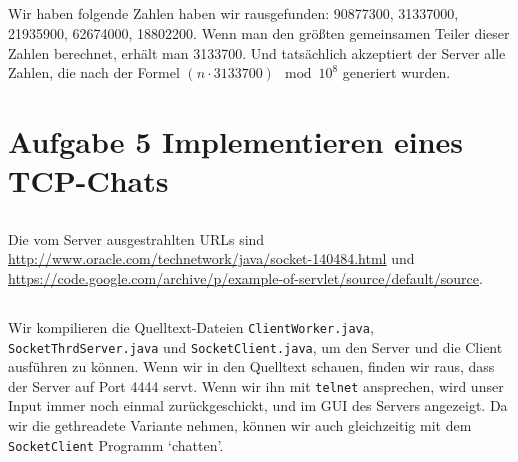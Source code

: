 \documentclass[10pt,a4paper]{article}
\begin{document}
\subsection{}
Wir haben folgende Zahlen haben wir rausgefunden:
90877300,
31337000,
21935900,
62674000,
18802200.
Wenn man den größten gemeinsamen Teiler dieser Zahlen berechnet,
erhält man 3133700. Und tatsächlich akzeptiert der Server alle Zahlen,
die nach der Formel $(n \cdot 3133700) \mod 10^8$ generiert wurden.

\section{Aufgabe 5 Implementieren eines TCP-Chats}
\setcounter{subsection}{0}
\subsection{}
Die vom Server ausgestrahlten URLs sind
\url{http://www.oracle.com/technetwork/java/socket-140484.html} und
\url{https://code.google.com/archive/p/example-of-servlet/source/default/source}.

\subsection{}
Wir kompilieren die Quelltext-Dateien \texttt{ClientWorker.java},
\texttt{SocketThrdServer.java} und \texttt{SocketClient.java},
um den Server und die Client ausführen zu können.
Wenn wir in den Quelltext schauen, finden wir raus, dass der Server
auf Port 4444 servt. Wenn wir ihn mit \texttt{telnet} ansprechen,
wird unser Input immer noch einmal zurückgeschickt, und im GUI des Servers
angezeigt. Da wir die gethreadete Variante nehmen, können wir auch gleichzeitig
mit dem \texttt{SocketClient} Programm `chatten'.
\end{document}
